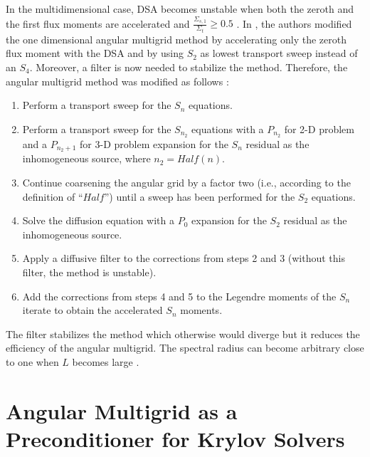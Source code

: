 \documentclass[preprint,10pt]{elsarticle}
\renewcommand{\(}{\left(}
\renewcommand{\)}{\right)}
\renewcommand{\[}{\left[}
\renewcommand{\]}{\right]}
\begin{document}
In the multidimensional case, DSA becomes unstable when both the zeroth
and the first flux moments are accelerated and $\frac{\Sigma_{s,1}}{\Sigma_t}
\geq 0.5$ \cite{multisweep}. In \cite{multigrid_2d}, the authors modified the
one dimensional angular multigrid method by accelerating only the zeroth flux
moment with the DSA and by using $S_2$ as lowest transport sweep
instead of an $S_4$. Moreover, a
filter is now needed to stabilize the method. Therefore, the angular multigrid 
method was modified as follows \cite{multigrid_2d} :
\begin{enumerate}
\item Perform a transport sweep for the $S_n$ equations.
\item Perform a transport sweep for the $S_{n_2}$ equations with a $P_{n_2}$
for 2-D problem and a $P_{n_2+1}$ for 3-D problem expansion for the $S_n$
residual as the inhomogeneous source, where $n_2=Half(n)$.
\item Continue coarsening the angular grid by a factor two (i.e., according to the
definition of ``$Half$'') until a sweep has been performed for the $S_2$
equations.
\item Solve the diffusion equation with a $P_0$ expansion for the $S_2$
residual as the inhomogeneous source. 
\item Apply a diffusive filter to the corrections from steps 2 and 3 (without
this filter, the method is unstable).
\item Add the corrections from steps 4 and 5 to the Legendre moments of the
$S_n$ iterate to obtain the accelerated $S_n$ moments.
\end{enumerate}
The filter stabilizes the method which otherwise would diverge but it reduces
the efficiency of the angular multigrid. The spectral radius can become
arbitrary close to one when $L$ becomes large \cite{multigrid_2d}.


\section{Angular Multigrid as a Preconditioner for Krylov Solvers} \label{sec:anmg_krylov}
\end{document}
